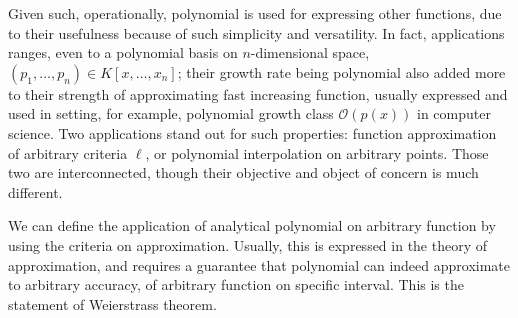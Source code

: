 \documentclass[
  journal=largetwo,
  year=2025,
  volume=37,
]{cup-journal}
\begin{document}
Given such, operationally, polynomial is used for expressing other functions, due to their usefulness because of such simplicity and versatility. In fact, applications ranges, even to a polynomial basis on $n$-dimensional space, $(p_{1},\dots,p_{n})\in K[x,\dots,x_{n}]$; their growth rate being polynomial also added more to their strength of approximating fast increasing function, usually expressed and used in setting, for example, polynomial growth class $\mathcal{O}(p(x))$ in computer science. Two applications stand out for such properties: function approximation of arbitrary criteria $\ell$, or polynomial interpolation on arbitrary points. Those two are interconnected, though their objective and object of concern is much different. 

We can define the application of analytical polynomial on arbitrary function by using the criteria on approximation. Usually, this is expressed in the theory of approximation, and requires a guarantee that polynomial can indeed approximate to arbitrary accuracy, of arbitrary function on specific interval. This is the statement of Weierstrass theorem. 
\end{document}
